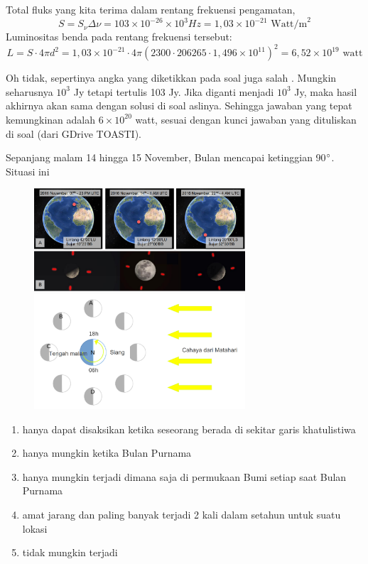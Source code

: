 \documentclass[11pt,fleqn]{exam}
\begin{document}
\begin{questions}
Total fluks yang kita terima dalam rentang frekuensi pengamatan,
\begin{equation*}
    S = S_\nu \Delta \nu= 103 \times 10^{-26} \times 10^3 Hz = 1,03 \times 10^{-21} \text{  Watt/m}^2    
\end{equation*}
Luminositas benda pada rentang frekuensi tersebut:
\begin{equation*}
    L = S \cdot 4 \pi d^2 = 1,03 \times 10^{-21} \cdot 4 \pi (2300 \cdot 206265 \cdot 1,496 \times 10^{11})^2 = 6,52 \times 10^{19} \text{  watt}
\end{equation*}

Oh tidak, sepertinya angka yang diketikkan pada soal juga salah \Smiley{}. Mungkin seharusnya $10^3$ Jy tetapi tertulis 103 Jy. Jika diganti menjadi $10^3$ Jy, maka hasil akhirnya akan sama dengan solusi di soal aslinya. Sehingga jawaban yang tepat kemungkinan adalah $6 \times 10^{20}$ watt, sesuai dengan kunci jawaban yang dituliskan di soal (dari GDrive TOASTI). 


\vspace{0.5cm}
\question Sepanjang malam 14 hingga 15 November, Bulan mencapai ketinggian 90$\degree$. Situasi ini
\begin{figure}[H]
\centering
\includegraphics[width=0.7\textwidth]{osp2022_1a.png}
\includegraphics[width=0.7\textwidth]{osp2022_1b.png}
\label{fig:osp2022_15}
\end{figure}
\begin{enumerate}
    \item hanya dapat disaksikan ketika seseorang berada di sekitar garis khatulistiwa
    \item hanya mungkin ketika Bulan Purnama
    \item hanya mungkin terjadi dimana saja di permukaan Bumi setiap saat Bulan Purnama
    \item amat jarang dan paling banyak terjadi 2 kali dalam setahun untuk suatu lokasi
    \item tidak mungkin terjadi
\end{enumerate}


\end{questions}
\end{document}
